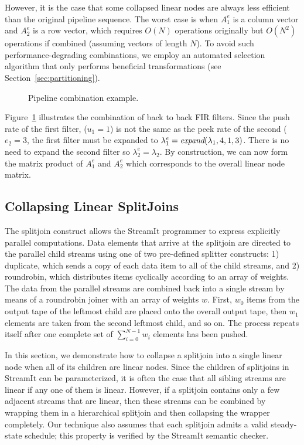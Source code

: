 {However, it is the case that some collapsed linear nodes are always
less efficient than the original pipeline sequence.  The worst case is
when $A_1^e$ is a column vector and $A_2^e$ is a row vector, which
requires $O(N)$ operations originally but $O(N^2)$ operations if
combined (assuming vectors of length $N$).  To avoid such
performance-degrading combinations, we employ an automated selection
algorithm that only performs beneficial transformations (see
Section~\ref{sec:partitioning}).

\begin{figure}[t]
\center
\epsfxsize=3.2in
\vspace{-6pt}
\caption{Pipeline combination example.}
\label{fig:example-pipeline-combination}
\vspace{-12pt}
\end{figure}

Figure~\ref{fig:example-pipeline-combination} illustrates the 
combination of back to back FIR filters. Since
the push rate of the first filter, ($u_1=1$) is not the same as
the peek rate of the second ($e_2=3$, the first filter
must be expanded to $\lambda_1^e = \mbox{\it expand}(\lambda_1,4,1,3)$.
There is no need to expand the second filter so 
$\lambda_2^e = \lambda_2$. By construction, we can now form the
matrix product of $A_1^e$ and $A_2^e$ which corresponds to the
overall linear node matrix.

\subsection{Collapsing Linear SplitJoins}

The splitjoin construct allows the StreamIt programmer to
express explicitly parallel computations.  Data elements that arrive
at the splitjoin are directed to the parallel child streams
using one of two pre-defined splitter constructs: 1) duplicate,
which sends a copy of each data item to all of the child streams, and
2) roundrobin, which distributes items cyclically according to an
array of weights.  The data from the parallel streams are
combined back into a single stream by means of a roundrobin 
joiner with an array of weights $w$.  First, $w_0$ items from the
output tape of the leftmost child are placed onto the overall output
tape, then $w_1$ elements are taken from the second leftmost child,
and so on.  The process repeats itself after one complete set of
$\sum_{i=0}^{N-1} w_i$ elements has been pushed.

In this section, we demonstrate how to collapse a splitjoin into
a single linear node when all of its children are linear nodes.  Since
the children of splitjoins in StreamIt can be parameterized, it
is often the case that all sibling streams are linear if any one of
them is linear.  However, if a splitjoin contains only a few
adjacent streams that are linear, then these streams can be combined
by wrapping them in a hierarchical splitjoin and then collapsing the
wrapper completely.  Our technique also assumes that each 
splitjoin admits a valid steady-state schedule; this property is
verified by the StreamIt semantic checker.

}
